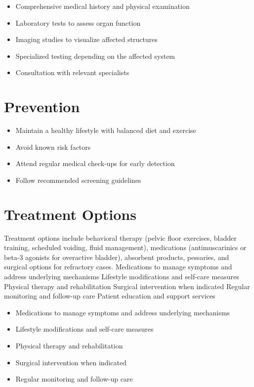 \begin{itemize}[noitemsep]
  \item Comprehensive medical history and physical examination
  \item Laboratory tests to assess organ function
  \item Imaging studies to visualize affected structures
  \item Specialized testing depending on the affected system
  \item Consultation with relevant specialists
\end{itemize}
\section{Prevention}
\begin{itemize}[noitemsep]
  \item Maintain a healthy lifestyle with balanced diet and exercise
  \item Avoid known risk factors
  \item Attend regular medical check-ups for early detection
  \item Follow recommended screening guidelines
\end{itemize}
\section{Treatment Options}
Treatment options include behavioral therapy (pelvic floor exercises, bladder training, scheduled voiding, fluid management), medications (antimuscarinics or beta-3 agonists for overactive bladder), absorbent products, pessaries, and surgical options for refractory cases. Medications to manage symptoms and address underlying mechanisms Lifestyle modifications and self-care measures Physical therapy and rehabilitation Surgical intervention when indicated Regular monitoring and follow-up care Patient education and support services

\begin{itemize}[noitemsep]
  \item Medications to manage symptoms and address underlying mechanisms
  \item Lifestyle modifications and self-care measures
  \item Physical therapy and rehabilitation
  \item Surgical intervention when indicated
  \item Regular monitoring and follow-up care
\end{itemize}
